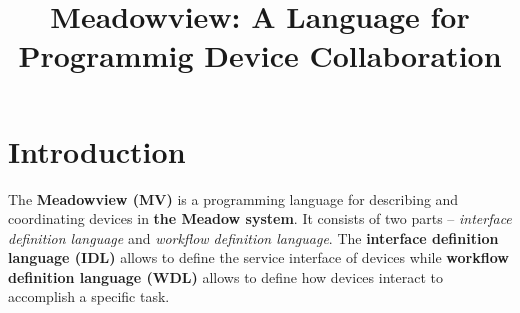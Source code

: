 \documentclass{note}
\begin{document}
\small

\title{\large\bf \textcolor{blue2}{Meadowview:  A Language for Programmig
    Device Collaboration}}  
\date{}
\maketitle

\section{Introduction}


The \textcolor{blue2}{\bf{}Meadowview (MV)} is a programming language for
describing and coordinating devices in \textcolor{blue2}{\bf{}the Meadow
  system}. It consists of two parts -- {\em interface definition language\/}
and {\em workflow definition language\/}. The \textcolor{blue2}{\bf{}interface 
  definition language (IDL)} allows to define the service interface of devices 
while \textcolor{blue2}{\bf{}workflow definition language (WDL)} allows to
define how devices interact to accomplish a specific task.
\end{document}
